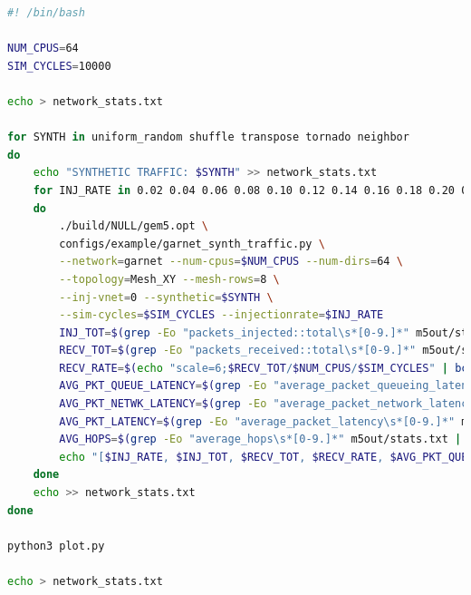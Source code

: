 \documentclass{article}
\begin{document}
\begin{lstlisting}[language=bash]
#! /bin/bash

NUM_CPUS=64
SIM_CYCLES=10000

echo > network_stats.txt

for SYNTH in uniform_random shuffle transpose tornado neighbor
do
	echo "SYNTHETIC TRAFFIC: $SYNTH" >> network_stats.txt
	for INJ_RATE in 0.02 0.04 0.06 0.08 0.10 0.12 0.14 0.16 0.18 0.20 0.22 0.24 0.26 0.28 0.30 0.32 0.34 0.36 0.38 0.40 0.42 0.44 0.46 0.48 0.50 0.52 0.54 0.56 0.58 0.60 0.62 0.64 0.66 0.68 0.70 0.72 0.74 0.76 0.78 0.80
	do
		./build/NULL/gem5.opt \
		configs/example/garnet_synth_traffic.py \
		--network=garnet --num-cpus=$NUM_CPUS --num-dirs=64 \
		--topology=Mesh_XY --mesh-rows=8 \
		--inj-vnet=0 --synthetic=$SYNTH \
		--sim-cycles=$SIM_CYCLES --injectionrate=$INJ_RATE
		INJ_TOT=$(grep -Eo "packets_injected::total\s*[0-9.]*" m5out/stats.txt | grep -Eo "[0-9.]*")
		RECV_TOT=$(grep -Eo "packets_received::total\s*[0-9.]*" m5out/stats.txt | grep -Eo "[0-9.]*")
		RECV_RATE=$(echo "scale=6;$RECV_TOT/$NUM_CPUS/$SIM_CYCLES" | bc)
		AVG_PKT_QUEUE_LATENCY=$(grep -Eo "average_packet_queueing_latency\s*[0-9.]*" m5out/stats.txt | grep -Eo "[0-9.]*")
		AVG_PKT_NETWK_LATENCY=$(grep -Eo "average_packet_network_latency\s*[0-9.]*" m5out/stats.txt | grep -Eo "[0-9.]*")
		AVG_PKT_LATENCY=$(grep -Eo "average_packet_latency\s*[0-9.]*" m5out/stats.txt | grep -Eo "[0-9.]*")
		AVG_HOPS=$(grep -Eo "average_hops\s*[0-9.]*" m5out/stats.txt | grep -Eo "[0-9.]*")
		echo "[$INJ_RATE, $INJ_TOT, $RECV_TOT, $RECV_RATE, $AVG_PKT_QUEUE_LATENCY, $AVG_PKT_NETWK_LATENCY, $AVG_PKT_LATENCY, $AVG_HOPS]" >> network_stats.txt
	done
	echo >> network_stats.txt
done

python3 plot.py

echo > network_stats.txt


\end{lstlisting}
\end{document}
